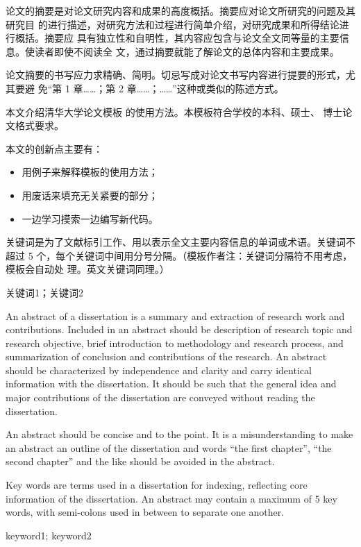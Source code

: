 ﻿%
\begin{cnabstract}

论文的摘要是对论文研究内容和成果的高度概括。摘要应对论文所研究的问题及其研究目
的进行描述，对研究方法和过程进行简单介绍，对研究成果和所得结论进行概括。摘要应
具有独立性和自明性，其内容应包含与论文全文同等量的主要信息。使读者即使不阅读全
文，通过摘要就能了解论文的总体内容和主要成果。

论文摘要的书写应力求精确、简明。切忌写成对论文书写内容进行提要的形式，尤其要避
免“第 1 章……；第 2 章……；……”这种或类似的陈述方式。

本文介绍清华大学论文模板 的使用方法。本模板符合学校的本科、硕士、
博士论文格式要求。

本文的创新点主要有：
\begin{itemize}
  \item 用例子来解释模板的使用方法；
  \item 用废话来填充无关紧要的部分；
  \item 一边学习摸索一边编写新代码。
\end{itemize}

关键词是为了文献标引工作、用以表示全文主要内容信息的单词或术语。关键词不超过 5
个，每个关键词中间用分号分隔。（模板作者注：关键词分隔符不用考虑，模板会自动处
理。英文关键词同理。）
\end{cnabstract}

\begin{cnkeywords}
关键词1；关键词2
\end{cnkeywords}
\newpage
\begin{enabstract}

An abstract of a dissertation is a summary and extraction of research work
and contributions. Included in an abstract should be description of research
topic and research objective, brief introduction to methodology and research
process, and summarization of conclusion and contributions of the
research. An abstract should be characterized by independence and clarity and
carry identical information with the dissertation. It should be such that the
general idea and major contributions of the dissertation are conveyed without
reading the dissertation.

An abstract should be concise and to the point. It is a misunderstanding to
make an abstract an outline of the dissertation and words ``the first
chapter'', ``the second chapter'' and the like should be avoided in the
abstract.

Key words are terms used in a dissertation for indexing, reflecting core
information of the dissertation. An abstract may contain a maximum of 5 key
words, with semi-colons used in between to separate one another.
\end{enabstract}

\begin{enkeywords}
keyword1; keyword2
\end{enkeywords} 